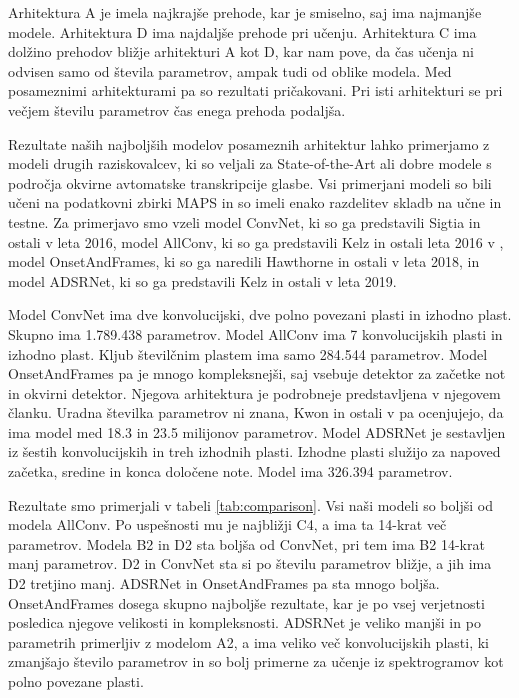 \documentclass[a4paper, 12pt, openright]{book}
\begin{document}
Arhitektura A je imela najkrajše prehode, kar je smiselno, saj ima najmanjše modele.
Arhitektura D ima najdaljše prehode pri učenju.
Arhitektura C ima dolžino prehodov bližje arhitekturi A kot D, kar nam pove, da čas učenja ni odvisen samo od števila parametrov, ampak tudi od oblike modela.
Med posameznimi arhitekturami pa so rezultati pričakovani.
Pri isti arhitekturi se pri večjem številu parametrov čas enega prehoda podaljša.

Rezultate naših najboljših modelov posameznih arhitektur lahko primerjamo z modeli drugih raziskovalcev, ki so veljali za State-of-the-Art ali dobre modele s področja okvirne avtomatske transkripcije glasbe.
Vsi primerjani modeli so bili učeni na podatkovni zbirki MAPS in so imeli enako razdelitev skladb na učne in testne.
Za primerjavo smo vzeli model ConvNet, ki so ga predstavili Sigtia in ostali v \cite{sigtia2016endtoend} leta 2016, model AllConv, ki so ga predstavili Kelz in ostali leta 2016 v \cite{kelz2016potential}, model OnsetAndFrames, ki so ga naredili Hawthorne in ostali v \cite{hawthorne2018onsets} leta 2018, in model ADSRNet, ki so ga predstavili Kelz in ostali v \cite{kelz2019deep} leta 2019.

Model ConvNet ima dve konvolucijski, dve polno povezani plasti in izhodno plast.
Skupno ima 1.789.438  parametrov.
Model AllConv ima 7 konvolucijskih plasti in izhodno plast.
Kljub številčnim plastem ima samo 284.544 parametrov.
Model OnsetAndFrames pa je mnogo kompleksnejši, saj vsebuje detektor za začetke not in okvirni detektor.
Njegova arhitektura je podrobneje predstavljena v njegovem članku.
Uradna številka parametrov ni znana, Kwon in ostali v \cite{kwon2020polyphonic} pa ocenjujejo, da ima model med 18.3 in 23.5 milijonov parametrov.
Model ADSRNet je sestavljen iz šestih konvolucijskih in treh izhodnih plasti.
Izhodne plasti služijo za napoved začetka, sredine in konca določene note.
Model ima 326.394 parametrov.

Rezultate smo primerjali v tabeli \ref{tab:comparison}.
Vsi naši modeli so boljši od modela AllConv.
Po uspešnosti mu je najbližji C4, a ima ta 14-krat več parametrov.
Modela B2 in D2 sta boljša od ConvNet, pri tem ima B2 14-krat manj parametrov.
D2 in ConvNet sta si po številu parametrov bližje, a jih ima D2 tretjino manj.
ADSRNet in OnsetAndFrames pa sta mnogo boljša.
OnsetAndFrames dosega skupno najboljše rezultate, kar je po vsej verjetnosti posledica njegove velikosti in kompleksnosti.
ADSRNet je veliko manjši in po parametrih primerljiv z modelom A2, a ima veliko več konvolucijskih plasti, ki zmanjšajo število parametrov in so bolj primerne za učenje iz spektrogramov kot polno povezane plasti.
\end{document}
